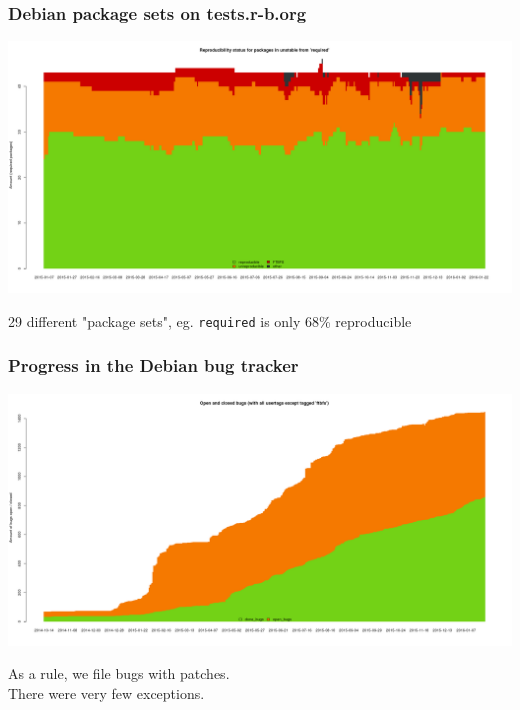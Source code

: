 \documentclass[14pt,aspectratio=169]{beamer}
\begin{document}
\begin{frame}
 \frametitle{Debian package sets on tests.r-b.org}
 \begin{center}
  \includegraphics[height=0.65\paperheight]{images/stats_meta_pkg_state_required.png}

  {\footnotesize{29 different "package sets", eg. \texttt{required} is only 68\%
  reproducible}}
 \end{center}
\end{frame}

\begin{frame}
 \frametitle{Progress in the Debian bug tracker}
 \begin{center}
    \includegraphics[height=0.65\paperheight]{images/stats_bugs_sin_ftbfs_state.png}

  {\footnotesize{As a rule, we file bugs with patches. \\
  There were very few exceptions.}}
 \end{center}
\end{frame}
\end{document}
